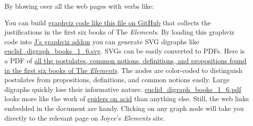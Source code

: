 By blowing over all the web pages with verbs like:

\begin{Shaded}
\begin{Highlighting}[]
\KeywordTok{=:} 


\KeywordTok{;}\RegionMarkerTok{(}\RegionMarkerTok{)} 
\RegionMarkerTok{)}
\end{Highlighting}
\end{Shaded}

You can build
\href{https://github.com/bakerjd99/jacks/blob/master/eucgvuts/euclid_digraph_books_1_6.gv}{graphviz
code like this file on GitHub} that collects the justifications in the
first six books of The \emph{Elements}. By loading this graphviz code
into \href{https://wiki.jsoftware.com/wiki/Addons/graphics/graphviz}{J's
graphviz addon} you can generate SVG digraphs like
\href{https://github.com/bakerjd99/jacks/blob/master/eucgvuts/euclid_digraph_books_1_6.svg}{euclid\_digraph\_books\_1\_6.svg}.
SVGs can be easily converted to PDFs. Here is a PDF of
\href{https://bakerjd99.files.wordpress.com/2023/06/euclid_digraph_books_1_6-1.pdf}{all
the postulates, common notions, definitions, and propositions found in
the first six books of The \emph{Elements}}. The nodes are color-coded
to distinguish postulates from propositions, definitions, and common
notions easily. Large digraphs quickly lose their informative nature.
\href{https://bakerjd99.files.wordpress.com/2023/06/euclid_digraph_books_1_6-1.pdf}{euclid\_digraph\_books\_1\_6.pdf}
looks more like the work of
\href{https://www.theguardian.com/science/2014/oct/04/spiders-lsd-drugs-experiment-1971}{spiders
on acid} than anything else. Still, the web links embedded in the
document are handy. Clicking on any graph node will take you directly to
the relevant page on Joyce's \emph{Elements} site.

